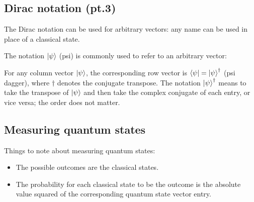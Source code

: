 \subsection{Dirac notation (pt.3)}
The Dirac notation can be used for arbitrary vectors: any name can be used in place of a classical state.

The notation $\ket{\psi}$ (psi) is commonly used to refer to an arbitrary vector:

\newpage

\begin{note}
    For any column vector $\ket{\psi}$, the corresponding row vector is $\bra{\psi}=\ket{\psi}^\dagger$ (psi dagger), where $\dagger$ denotes the conjugate transpose. The notation $\ket{\psi}^\dagger$ means to take the transpose of $\ket{\psi}$ and then take the complex conjugate of each entry, or vice versa; the order does not matter.
\end{note}

\subsection{Measuring quantum states}
Things to note about measuring quantum states:
\begin{itemize}
    \item The possible outcomes are the classical states.
    \item The probability for each classical state to be the outcome is the absolute value squared of the corresponding quantum state vector entry.
\end{itemize}

